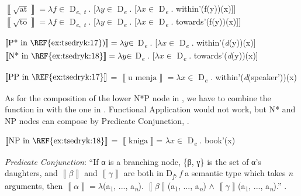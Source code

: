 \documentclass[output=paper,colorlinks,citecolor=brown,modfonts,nonflat]{langsci/langscibook}
\begin{document}
\ea%
    \label{ex:tsedryk:20}
    \ea\label{ex:tsedryk:20a}
    $\left\llbracket \sqrt{\text{at}}\right\rrbracket  = {\lambda}f {\in}$ D\textsubscript{{\textlangle}}\textit{\textsubscript{e}}\textsubscript{,} \textit{\textsubscript{t}}\textsubscript{{\textrangle}} . [${\lambda}y {\in}$ D\textit{\textsubscript{e}} . [${\lambda}x {\in}$ D\textit{\textsubscript{e}} . within'(f(y))(x)]]
    \ex\label{ex:tsedryk:20b}
    $\left\llbracket \sqrt{\text{to}}\right\rrbracket  = {\lambda}f {\in}$ D\textsubscript{{\textlangle}}\textit{\textsubscript{e}}\textsubscript{,} \textit{\textsubscript{t}}\textsubscript{{\textrangle}} . [${\lambda}y {\in}$ D\textit{\textsubscript{e}} . [${\lambda}x {\in}$ D\textit{\textsubscript{e}} . towards'(f(y))(x)]]
    \z
\z

\ea%
    \label{ex:tsedryk:21}
    \ea\label{ex:tsedryk:21a}
    $\left\llbracket \text{P* in \REF{ex:tsedryk:17}}\text )\right\rrbracket  = {\lambda}y {\in}$ D\textit{\textsubscript{e}}\textsubscript{} . [${\lambda}x {\in}$ D\textit{\textsubscript{e}} . within'(\textit{d}(y))(x)] 
    \ex\label{ex:tsedryk:21b}
    $\left\llbracket \text{N* in \REF{ex:tsedryk:18}}\right\rrbracket  = {\lambda}y {\in}$ D\textit{\textsubscript{e}} . [${\lambda}x {\in}$ D\textit{\textsubscript{e}} . towards'(\textit{d}(y))(x)]  
    \z
\z

\ea%
    \label{ex:tsedryk:22}
    $\left\llbracket \text{PP in \REF{ex:tsedryk:17}}\right\rrbracket $ =  $\left\llbracket \text{u menja}\right\rrbracket  = {\lambda}x {\in}$ D\textit{\textsubscript{e}} . within'(\textit{d}(speaker'))(x)
    \z

As for the composition of the lower N*P node in , we have to combine the function in  with the one in . Functional Application would not work, but N* and NP nodes can compose by Predicate Conjunction, .

\ea%
    \label{ex:tsedryk:23}
    $\left\llbracket \text{NP in \REF{ex:tsedryk:18}}\right\rrbracket $ =  $\left\llbracket \text{kniga}\right\rrbracket $= ${\lambda}x {\in}$ D\textit{\textsubscript{e}} . book'(x)
    \z

          

\ea%
    \label{ex:tsedryk:24}
    \textit{Predicate Conjunction}: “If α is a branching node, \{β, γ\} is the set of α’s daughters, and  $\left\llbracket \beta \right\rrbracket $  and  $\left\llbracket \gamma \right\rrbracket $  are both in D\textit{\textsubscript{f}}, \textit{f} a semantic type which takes \textit{n} arguments, then  $\left\llbracket \alpha \right\rrbracket  = {\lambda}$(a\textsubscript{1}, ..., a\textit{\textsubscript{n}}).  $\left\llbracket \beta \right\rrbracket $(a\textsubscript{1}, ..., a\textit{\textsubscript{n}}) ${\wedge}$  $\left\llbracket \gamma \right\rrbracket $(a\textsubscript{1}, ..., a\textit{\textsubscript{n}}).” \hfill \citep[41]{Myler2016}.
    \z
\end{document}
